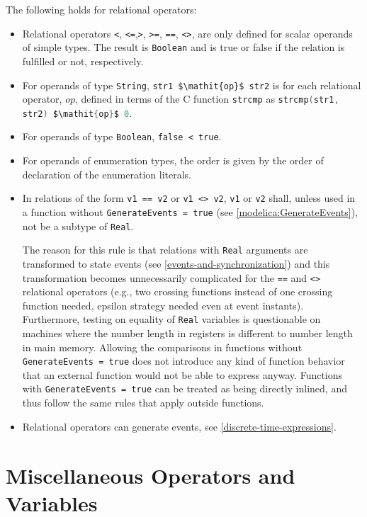 The following holds for relational operators:
\begin{itemize}
\item
  Relational operators \lstinline!<!, \lstinline!<=!,\lstinline!>!, \lstinline!>=!, \lstinline!==!, \lstinline!<>!, are only defined for scalar operands of simple types.
  The result is \lstinline!Boolean! and is true or false if the relation is fulfilled or not, respectively.
\item
  For operands of type \lstinline!String!, \lstinline!str1 $\mathit{op}$ str2! is for each relational operator, $\mathit{op}$, defined in terms of the C function \lstinline[language=C]!strcmp! as \lstinline[language=C]!strcmp(str1, str2) $\mathit{op}$ 0!.
\item
  For operands of type \lstinline!Boolean!, \lstinline!false < true!.
\item
  For operands of enumeration types, the order is given by the order of declaration of the enumeration literals.
\item
  In relations of the form \lstinline!v1 == v2! or \lstinline!v1 <> v2!, \lstinline!v1! or \lstinline!v2! shall, unless used in a function without \lstinline!GenerateEvents = true! (see \cref{modelica:GenerateEvents}), not be a subtype of \lstinline!Real!.
  \begin{nonnormative}
  The reason for this rule is that relations with \lstinline!Real! arguments are transformed to state events (see \cref{events-and-synchronization}) and this transformation becomes unnecessarily complicated for the \lstinline!==! and \lstinline!<>! relational operators (e.g., two crossing functions instead of one crossing function needed, epsilon strategy needed even at event instants).
  Furthermore, testing on equality of \lstinline!Real! variables is questionable on machines where the number length in registers is different to number length in main memory.
  Allowing the comparisons in functions without \lstinline!GenerateEvents = true! does not introduce any kind of function behavior that an external function would not be able to express anyway.
  Functions with \lstinline!GenerateEvents = true! can be treated as being directly inlined, and thus follow the same rules that apply outside functions.
  \end{nonnormative}
\item
  Relational operators can generate events, see \cref{discrete-time-expressions}.
\end{itemize}

\section{Miscellaneous Operators and Variables}\label{miscellaneous-operators-and-variables}

